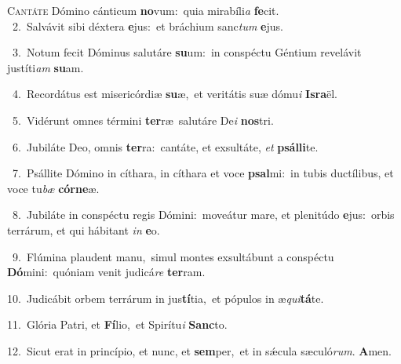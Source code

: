 \lettrine{\initial\textcolor{\initialcolor}{C}}{antáte} Dómino cánticum \textbf{no}\-vum:~\star quia mirabíli\textit{a} \textbf{fe}\-cit.\\
{\numbfont\textcolor{\numbcolor}{~2.}}~Salvávit sibi déxtera \textbf{e}\-jus:~\star et bráchium sanc\textit{tum} \textbf{e}\-jus.\par
{\numbfont\textcolor{\numbcolor}{~3.}}~Notum fecit Dóminus salutáre \textbf{su}\-um:~\star in conspéctu Géntium revelávit justíti\textit{am} \textbf{su}\-am.\par
{\numbfont\textcolor{\numbcolor}{~4.}}~Recordátus est misericórdiæ \textbf{su}\-æ,~\star et veritátis suæ dómu\textit{i} \textbf{Is}\-\textbf{ra}ël.\par
{\numbfont\textcolor{\numbcolor}{~5.}}~Vidérunt omnes términi \textbf{ter}\-ræ~\star salutáre De\textit{i} \textbf{nos}\-tri.\par
{\numbfont\textcolor{\numbcolor}{~6.}}~Jubiláte Deo, omnis \textbf{ter}\-ra:~\star cantáte, et exsultáte, \textit{et} \textbf{psál}\-\textbf{li}te.\par
{\numbfont\textcolor{\numbcolor}{~7.}}~Psállite Dómino in cíthara, in cíthara et voce \textbf{psal}\-mi:~\star in tubis ductílibus, et voce tu\textit{bæ} \textbf{cór}\-\textbf{ne}æ.\par
{\numbfont\textcolor{\numbcolor}{~8.}}~Jubiláte in conspéctu regis Dómini:~\dagger moveátur mare, et plenitúdo \textbf{e}\-jus:~\star orbis terrárum, et qui hábitant \textit{in} \textbf{e}\-o.\par
{\numbfont\textcolor{\numbcolor}{~9.}}~Flúmina plaudent manu,~\dagger simul montes exsultábunt a conspéctu \textbf{Dó}\-mini:~\star quóniam venit judicá\textit{re} \textbf{ter}\-ram.\par
{\numbfont\textcolor{\numbcolor}{10.}}~Judicábit orbem terrárum in jus\-\textbf{tí}\-tia,~\star et pópulos in æ\-\textit{qui}\-\textbf{tá}te.\par
{\numbfont\textcolor{\numbcolor}{11.}}~Glória Patri, et \textbf{Fí}\-lio,~\star et Spirítu\textit{i} \textbf{Sanc}\-to.\par
{\numbfont\textcolor{\numbcolor}{12.}}~Sicut erat in princípio, et nunc, et \textbf{sem}\-per,~\star et in sǽcula sæculó\-\textit{rum}\-. \textbf{A}\-men.\par
